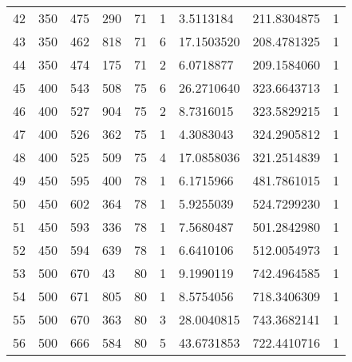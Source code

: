 \begin{longtable}{lllllllll}
  42 & 350 & 475 & 290 & 71 & 1 & 3.5113184 & 211.8304875 & 1 \\
  43 & 350 & 462 & 818 & 71 & 6 & 17.1503520 & 208.4781325 & 1 \\
  44 & 350 & 474 & 175 & 71 & 2 & 6.0718877 & 209.1584060 & 1 \\
  45 & 400 & 543 & 508 & 75 & 6 & 26.2710640 & 323.6643713 & 1 \\
  46 & 400 & 527 & 904 & 75 & 2 & 8.7316015 & 323.5829215 & 1 \\
  47 & 400 & 526 & 362 & 75 & 1 & 4.3083043 & 324.2905812 & 1 \\
  48 & 400 & 525 & 509 & 75 & 4 & 17.0858036 & 321.2514839 & 1 \\
  49 & 450 & 595 & 400 & 78 & 1 & 6.1715966 & 481.7861015 & 1 \\
  50 & 450 & 602 & 364 & 78 & 1 & 5.9255039 & 524.7299230 & 1 \\
  51 & 450 & 593 & 336 & 78 & 1 & 7.5680487 & 501.2842980 & 1 \\
  52 & 450 & 594 & 639 & 78 & 1 & 6.6410106 & 512.0054973 & 1 \\
  53 & 500 & 670 & 43 & 80 & 1 & 9.1990119 & 742.4964585 & 1 \\
  54 & 500 & 671 & 805 & 80 & 1 & 8.5754056 & 718.3406309 & 1 \\
  55 & 500 & 670 & 363 & 80 & 3 & 28.0040815 & 743.3682141 & 1 \\
  56 & 500 & 666 & 584 & 80 & 5 & 43.6731853 & 722.4410716 & 1
  \end{longtable}

